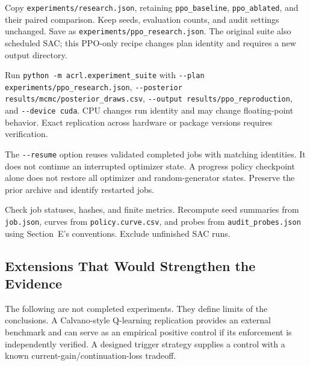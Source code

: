 Copy \texttt{experiments/research.json}, retaining \texttt{ppo\_baseline}, \texttt{ppo\_ablated}, and their paired comparison. Keep seeds, evaluation counts, and audit settings unchanged. Save as \texttt{experiments/ppo\_research.json}. The original suite also scheduled SAC; this PPO-only recipe changes plan identity and requires a new output directory.

Run \texttt{python -m acrl.experiment\_suite} with \texttt{-\/-plan experiments/ppo\_research.json}, \texttt{-\/-posterior results/mcmc/posterior\_draws.csv}, \texttt{-\/-output results/ppo\_reproduction}, and \texttt{-\/-device cuda}. CPU changes run identity and may change floating-point behavior. Exact replication across hardware or package versions requires verification.

The \texttt{-\/-resume} option reuses validated completed jobs with matching identities. It does not continue an interrupted optimizer state. A progress policy checkpoint alone does not restore all optimizer and random-generator states. Preserve the prior archive and identify restarted jobs.

Check job statuses, hashes, and finite metrics. Recompute seed summaries from \texttt{job.json}, curves from \texttt{policy.curve.csv}, and probes from \texttt{audit\_probes.json} using Section~E's conventions. Exclude unfinished SAC runs.

\subsection{Extensions That Would Strengthen the Evidence}

The following are not completed experiments. They define limits of the conclusions. A Calvano-style Q-learning replication provides an external benchmark and can serve as an empirical positive control if its enforcement is independently verified. A designed trigger strategy supplies a control with a known current-gain/continuation-loss tradeoff.

